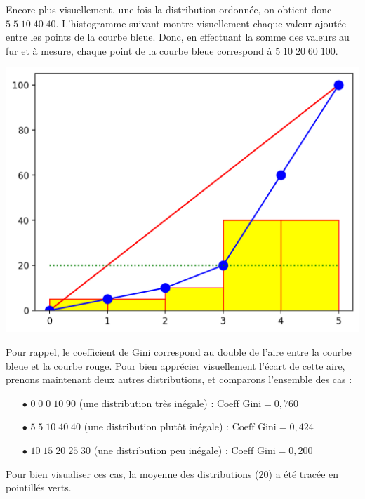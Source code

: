 \documentclass[11pt,a4paper]{article}
\begin{document}
\bigskip

Encore plus visuellement, une fois la distribution ordonnée, on obtient donc $ 5 \; 5 \; 10 \; 40 \; 40 $.
L'histogramme suivant montre visuellement chaque valeur ajoutée entre les points de la courbe bleue.
Donc, en effectuant la somme des valeurs au fur et à mesure, chaque point de la courbe bleue correspond à $ 5 \; 10 \; 20 \; 60 \; 100 $.

\bigskip

\begin{center}
\includegraphics[scale=0.60]{images/exemple_courbe_lorenz-5-5-10-40-40.png}
\end{center}

\bigskip

Pour rappel, le coefficient de Gini correspond au double de l'aire entre la courbe bleue et la courbe rouge.
Pour bien apprécier visuellement l'écart de cette aire, prenons maintenant deux autres distributions, et comparons l'ensemble des cas :

\begin{itemize}
\item[$\bullet$] $ 0 \; 0 \; 0 \; 10 \; 90 $ (une distribution très inégale) : $ \text{Coeff Gini} = 0,760 $
\item[$\bullet$] $ 5 \; 5 \; 10 \; 40 \; 40 $ (une distribution plutôt inégale) : $ \text{Coeff Gini} = 0,424 $
\item[$\bullet$] $ 10 \; 15 \; 20 \; 25 \; 30 $ (une distribution peu inégale) : $ \text{Coeff Gini} = 0,200 $
\end{itemize}

Pour bien visualiser ces cas, la moyenne des distributions ($ 20 $) a été tracée en pointillés verts.
\end{document}
